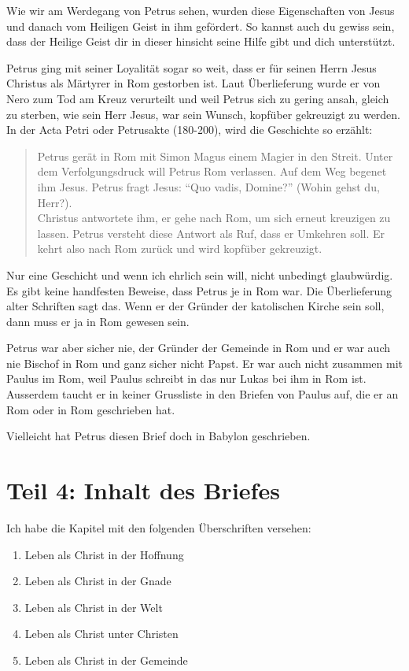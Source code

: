 \documentclass[fontsize=16pt]{mybib}
\begin{document}
Wie wir am Werdegang von Petrus sehen, wurden diese Eigenschaften von Jesus und danach vom Heiligen Geist in ihm gefördert. So kannst auch du gewiss sein, dass der Heilige Geist dir in dieser hinsicht seine Hilfe gibt und dich unterstützt.

Petrus ging mit seiner Loyalität sogar so weit, dass er für seinen Herrn Jesus Christus als Märtyrer in Rom gestorben ist. Laut Überlieferung wurde er von Nero zum Tod am Kreuz verurteilt und weil Petrus sich zu gering ansah, gleich zu sterben, wie sein Herr Jesus, war sein Wunsch, kopfüber gekreuzigt zu werden. In der Acta Petri oder Petrusakte (180-200\nChr), wird die Geschichte so erzählt:
\begin{quote}
    Petrus gerät in Rom mit Simon Magus einem Magier in den Streit. Unter dem Verfolgungsdruck will Petrus Rom verlassen. Auf dem Weg begenet ihm Jesus. Petrus fragt Jesus: \enquote{Quo vadis, Domine?} (Wohin gehst du, Herr?).\\
    Christus antwortete ihm, er gehe nach Rom, um sich erneut kreuzigen zu lassen. Petrus versteht diese Antwort als Ruf, dass er Umkehren soll. Er kehrt also nach Rom zurück und wird kopfüber gekreuzigt.
\end{quote}
Nur eine Geschicht und wenn ich ehrlich sein will, nicht unbedingt glaubwürdig. Es gibt keine handfesten Beweise, dass Petrus je in Rom war. Die Überlieferung alter Schriften sagt das. Wenn er der Gründer der katolischen Kirche sein soll, dann muss er ja in Rom gewesen sein.

Petrus war aber sicher nie, der Gründer der Gemeinde in Rom und er war auch nie Bischof in Rom und ganz sicher nicht Papst. Er war auch nicht zusammen mit Paulus im Rom, weil Paulus schreibt in  das nur Lukas bei ihm in Rom ist. Ausserdem taucht er in keiner Grussliste in den Briefen von Paulus auf, die er an Rom oder in Rom geschrieben hat.

Vielleicht hat Petrus diesen Brief doch in Babylon geschrieben. 


\section{Teil 4: Inhalt des Briefes}
Ich habe die Kapitel mit den folgenden Überschriften versehen:

\begin{enumerate}
    \item Leben als Christ in der Hoffnung
    \item Leben als Christ in der Gnade
    \item Leben als Christ in der Welt
    \item Leben als Christ unter Christen
    \item Leben als Christ in der Gemeinde
\end{enumerate}
\end{document}
